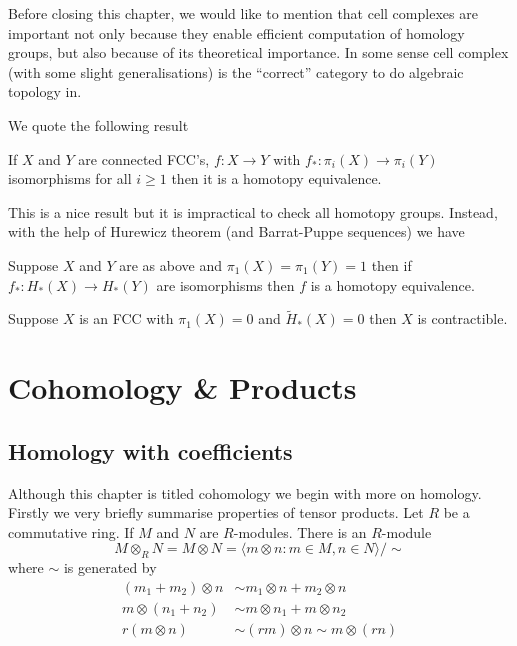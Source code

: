 \documentclass[a4paper]{article}
\begin{document}
Before closing this chapter, we would like to mention that cell complexes are important not only because they enable efficient computation of homology groups, but also because of its theoretical importance. In some sense cell complex (with some slight generalisations) is the ``correct'' category to do algebraic topology in.

We quote the following result

\begin{theorem}[Whitehead]
  If \(X\) and \(Y\) are connected FCC's, \(f: X \to Y\) with \(f_*: \pi_i(X) \to \pi_i(Y)\) isomorphisms for all \(i \geq 1\) then it is a homotopy equivalence.
\end{theorem}

This is a nice result but it is impractical to check all homotopy groups. Instead, with the help of Hurewicz theorem (and Barrat-Puppe sequences) we have

\begin{corollary}
  Suppose \(X\) and \(Y\) are as above and \(\pi_1(X) = \pi_1(Y) = 1\) then if \(f_*: H_*(X) \to H_*(Y)\) are isomorphisms then \(f\) is a homotopy equivalence.
\end{corollary}

\begin{corollary}
  Suppose \(X\) is an FCC with \(\pi_1(X) = 0\) and \(\widetilde H_*(X) = 0\) then \(X\) is contractible.
\end{corollary}

\section{Cohomology \& Products}

\subsection{Homology with coefficients}

Although this chapter is titled cohomology we begin with more on homology. Firstly we very briefly summarise properties of tensor products. Let \(R\) be a commutative ring. If \(M\) and \(N\) are \(R\)-modules. There is an \(R\)-module
\[
  M \otimes_R N = M \otimes N = \langle m \otimes n: m \in M, n \in N \rangle/\sim
\]
where \(\sim\) is generated by
\begin{align*}
  (m_1 + m_2) \otimes n &\sim m_1 \otimes n + m_2 \otimes n \\
  m \otimes (n_1 + n_2) &\sim m \otimes n_1 + m \otimes n_2 \\
  r(m \otimes n) &\sim (rm) \otimes n \sim m \otimes (rn)
\end{align*}
\end{document}
